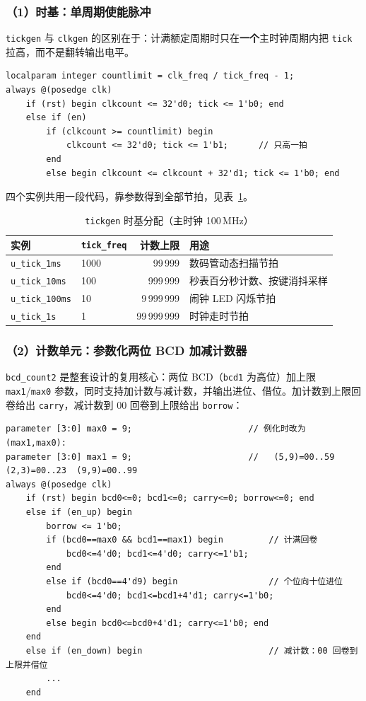 \documentclass[12pt, a4paper]{ctexart}
\begin{document}
\subsubsection*{（1）时基：单周期使能脉冲}
\texttt{tickgen} 与 \texttt{clkgen} 的区别在于：计满额定周期时只在\textbf{一个}主时钟周期内把 \texttt{tick} 拉高，而不是翻转输出电平。

\begin{lstlisting}
localparam integer countlimit = clk_freq / tick_freq - 1;
always @(posedge clk)
    if (rst) begin clkcount <= 32'd0; tick <= 1'b0; end
    else if (en)
        if (clkcount >= countlimit) begin
            clkcount <= 32'd0; tick <= 1'b1;      // 只高一拍
        end
        else begin clkcount <= clkcount + 32'd1; tick <= 1'b0; end
\end{lstlisting}

四个实例共用一段代码，靠参数得到全部节拍，见表~\ref{tab:tick}。

\begin{table}[htbp]
    \centering
    \caption{\texttt{tickgen} 时基分配（主时钟 100\,MHz）}
    \label{tab:tick}
    \begin{tabular}{llrl}
        \hline
        实例 & \texttt{tick\_freq} & 计数上限 & 用途 \\
        \hline
        \texttt{u\_tick\_1ms}   & 1000 & 99\,999     & 数码管动态扫描节拍 \\
        \texttt{u\_tick\_10ms}  & 100  & 999\,999    & 秒表百分秒计数、按键消抖采样 \\
        \texttt{u\_tick\_100ms} & 10   & 9\,999\,999 & 闹钟 LED 闪烁节拍 \\
        \texttt{u\_tick\_1s}    & 1    & 99\,999\,999 & 时钟走时节拍 \\
        \hline
    \end{tabular}
\end{table}

\subsubsection*{（2）计数单元：参数化两位 BCD 加减计数器}
\texttt{bcd\_count2} 是整套设计的复用核心：两位 BCD（\texttt{bcd1} 为高位）加上限 \texttt{max1}/\texttt{max0} 参数，同时支持加计数与减计数，并输出进位、借位。加计数到上限回卷给出 \texttt{carry}，减计数到 00 回卷到上限给出 \texttt{borrow}：

\begin{lstlisting}
parameter [3:0] max0 = 9;                       // 例化时改为 (max1,max0):
parameter [3:0] max1 = 9;                       //   (5,9)=00..59  (2,3)=00..23  (9,9)=00..99
always @(posedge clk)
    if (rst) begin bcd0<=0; bcd1<=0; carry<=0; borrow<=0; end
    else if (en_up) begin
        borrow <= 1'b0;
        if (bcd0==max0 && bcd1==max1) begin         // 计满回卷
            bcd0<=4'd0; bcd1<=4'd0; carry<=1'b1;
        end
        else if (bcd0==4'd9) begin                  // 个位向十位进位
            bcd0<=4'd0; bcd1<=bcd1+4'd1; carry<=1'b0;
        end
        else begin bcd0<=bcd0+4'd1; carry<=1'b0; end
    end
    else if (en_down) begin                         // 减计数：00 回卷到上限并借位
        ...
    end
\end{lstlisting}
\end{document}
